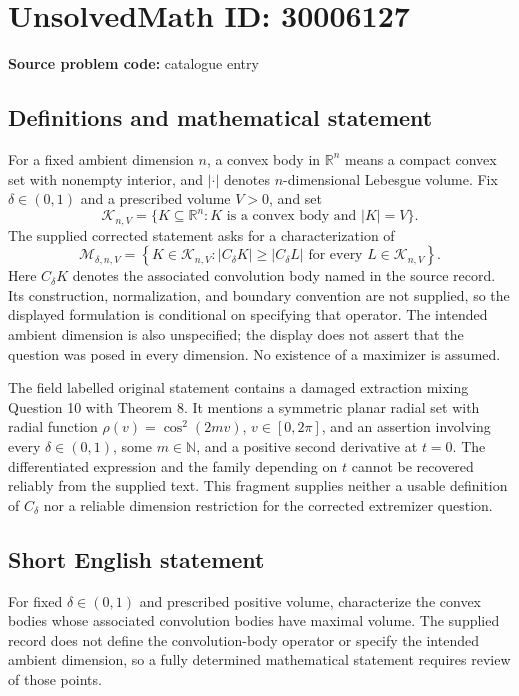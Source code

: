 \documentclass[11pt]{article}
\newcommand{\N}{\mathbb{N}}
\newcommand{\R}{\mathbb{R}}
\begin{document}
\section*{UnsolvedMath ID: 30006127}
\textbf{Source problem code:} catalogue entry
\subsection{Definitions and mathematical statement}
For a fixed ambient dimension \(n\), a convex body in \(\R^n\) means a compact convex set with nonempty interior, and \(|\cdot|\) denotes \(n\)-dimensional Lebesgue volume. Fix \(\delta\in(0,1)\) and a prescribed volume \(V>0\), and set
\[
\mathcal K_{n,V}=\{K\subseteq\R^n:K\text{ is a convex body and }|K|=V\}.
\]
The supplied corrected statement asks for a characterization of
\[
\mathcal M_{\delta,n,V}
=
\left\{K\in\mathcal K_{n,V}:
|C_\delta K|\geq |C_\delta L|
\text{ for every }L\in\mathcal K_{n,V}
\right\}.
\]
Here \(C_\delta K\) denotes the associated convolution body named in the source record. Its construction, normalization, and boundary convention are not supplied, so the displayed formulation is conditional on specifying that operator. The intended ambient dimension is also unspecified; the display does not assert that the question was posed in every dimension. No existence of a maximizer is assumed.

The field labelled original statement contains a damaged extraction mixing Question 10 with Theorem 8. It mentions a symmetric planar radial set with radial function \(\rho(v)=\cos^2(2mv)\), \(v\in[0,2\pi]\), and an assertion involving every \(\delta\in(0,1)\), some \(m\in\N\), and a positive second derivative at \(t=0\). The differentiated expression and the family depending on \(t\) cannot be recovered reliably from the supplied text. This fragment supplies neither a usable definition of \(C_\delta\) nor a reliable dimension restriction for the corrected extremizer question.
\subsection{Short English statement}
For fixed \(\delta\in(0,1)\) and prescribed positive volume, characterize the convex bodies whose associated convolution bodies have maximal volume. The supplied record does not define the convolution-body operator or specify the intended ambient dimension, so a fully determined mathematical statement requires review of those points.
\end{document}
